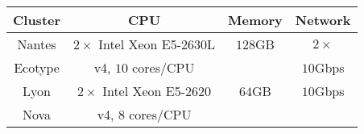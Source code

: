 
\begin{tabular}{cccc}
   \toprule
   Cluster & CPU & Memory & Network\\
   \midrule
   Nantes& $2\times$ Intel Xeon E5-2630L & $128$GB & $2\times$\\
   Ecotype & v4, $10$ cores/CPU &  & $10$Gbps \\
   \midrule
   Lyon & $2\times$ Intel Xeon E5-2620 & $64$GB & $10$Gbps\\
   Nova & v4, $8$ cores/CPU &  & \\
   \bottomrule
\end{tabular}

